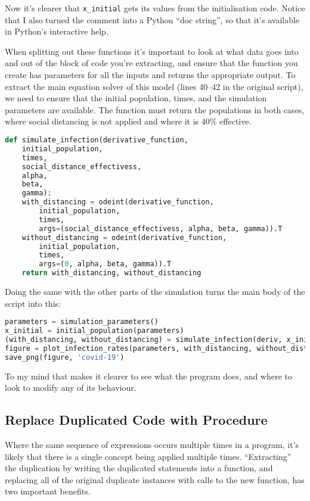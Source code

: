 \documentclass[a4paper]{article}
\begin{document}
Now it's clearer that \texttt{x\_initial} gets its values from the initialisation code.
Notice that I also turned the comment into a Python ``doc string'', so that it's available in Python's interactive help.

When splitting out these functions it's important to look at what data goes into and out of the block of code you're extracting, and ensure that the function you create has parameters for all the inputs and returns the appropriate output.
To extract the main equation solver of this model (lines 40--42 in the original script), we need to ensure that the initial population, times, and the simulation parameters are available.
The function must return the populations in both cases, where social distancing is not applied and where it is 40\% effective.

\begin{lstlisting}[language=Python]
def simulate_infection(derivative_function,
    initial_population,
    times,
    social_distance_effectivess,
    alpha,
    beta,
    gamma):
    with_distancing = odeint(derivative_function,
        initial_population,
        times,
        args=(social_distance_effectivess, alpha, beta, gamma)).T
    without_distancing = odeint(derivative_function,
        initial_population,
        times,
        args=(0, alpha, beta, gamma)).T
    return with_distancing, without_distancing
\end{lstlisting}

Doing the same with the other parts of the simulation turns the main body of the script into this:

\begin{lstlisting}[language=Python]
parameters = simulation_parameters()
x_initial = initial_population(parameters)
(with_distancing, without_distancing) = simulate_infection(deriv, x_initial, parameters)
figure = plot_infection_rates(parameters, with_distancing, without_distancing)
save_png(figure, 'covid-19')
\end{lstlisting}

To my mind that makes it clearer to see what the program does, and where to look to modify any of its behaviour.

\subsection{Replace Duplicated Code with Procedure}

Where the same sequence of expressions occurs multiple times in a program, it's likely that there is a single concept being applied multiple times.
``Extracting'' the duplication by writing the duplicated statements into a function, and replacing all of the original duplicate instances with calls to the new function, has two important benefits.
\end{document}
